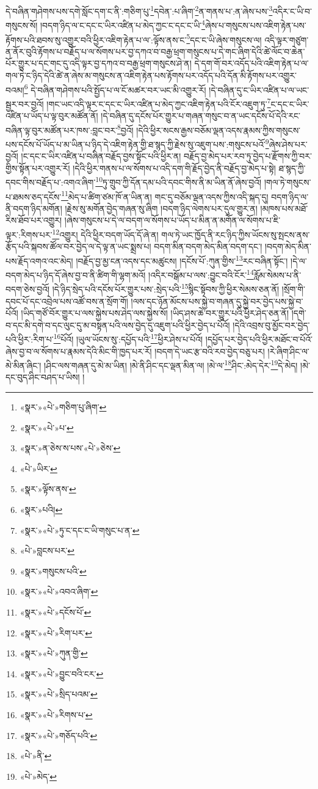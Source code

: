 དེ་བཞིན་གཤེགས་པས་དགེ་སློང་དག་ང་ནི་:གཅིག་པུ་\footnote{«སྣར་»«པེ་»གཅིག་པུ་ཞིག་}དབེན་:པ་ཞིག་\footnote{«སྣར་»«པེ་»པ་}ན་གནས་པ་:ན་ཞེས་པས་\footnote{«སྣར་»ན་ཅེས་ས་པས་«པེ་»ཅེས་}འདིར་ང་ཡི་བ་གསུངས་སོ། །བདག་ཉིད་ལ་ང་དང་ང་ཡིར་འཛིན་པ་མེད་ཀྱང་ང་དང་ང་ཡི་\footnote{«པེ་»ཡིར་}ཞེས་པ་གསུངས་པས་འཇིག་རྟེན་པས་རྟོགས་པའི་ཐབས་སུ་འགྱུར་བའི་ཕྱིར་འཇིག་རྟེན་པ་ལ་:ལྟོས་ནས་ང་\footnote{«སྣར་»ལྟོས་ནས་}དང་ང་ཡི་ཞེས་གསུངས་ལ། འདི་ལྟར་གཙུག་ན་ནོར་བུའི་རྟོགས་པ་བརྗོད་པ་ལ་སོགས་པར་བྱ་དཀའ་བ་བརྒྱ་ཕྲག་གསུངས་པ་དེ་གང་ཞིག་དེའི་ཚེ་ལོང་བ་ཆེན་པོར་གྱུར་པ་དང་གང་དུ་འདི་ལྟར་བྱ་དཀའ་བ་བརྒྱ་ཕྲག་གསུངས་ཤེ་ན། དེ་དག་གོ་བར་འདོད་པའི་འཇིག་རྟེན་པ་ལ་གལ་ཏེ་ང་ཉིད་དེའི་ཚེ་ན་ཞེས་མ་གསུངས་ན་འཇིག་རྟེན་པས་རྟོགས་པར་འདོད་པའི་དོན་མི་རྟོགས་པར་འགྱུར་བའམ།\footnote{«སྣར་»པའི།} དེ་བཞིན་གཤེགས་པའི་སྤྱོད་པ་ལ་ངོ་མཚར་བར་ཡང་མི་འགྱུར་རོ། །དེ་བཞིན་དུ་ང་ཡིར་འཛིན་པ་ལ་ཡང་སྦྱར་བར་བྱའོ། །གང་ཡང་འདི་ལྟར་ང་དང་ང་ཡིར་འཛིན་པ་མེད་ཀྱང་འཇིག་རྟེན་པའི་ངོར་འཇུག་ཏུ་\footnote{«སྣར་»«པེ་»ཏུ་ང་དང་ང་ཡི་གསུང་པ་ན་}ང་དང་ང་ཡིར་འཛིན་པ་ཡོད་པ་ལྟ་བུར་མཚོན་ནོ། །དེ་བཞིན་དུ་དངོས་པོར་གྱུར་པ་གཞན་གསུང་བ་ན་ཡང་དངོས་པོ་དེའི་རང་བཞིན་ལྟ་བུར་མཚོན་པར་ཁས་:བླང་བར་\footnote{«པེ་»བླངས་པར་}བྱའོ། །དེའི་ཕྱིར་སངས་རྒྱས་བཅོམ་ལྡན་འདས་རྣམས་ཀྱིས་གསུངས་པས་དངོས་པོ་ཡོད་པ་མ་ཡིན་པ་ཉིད་དེ་འཇིག་རྟེན་གྱི་ཐ་སྙད་ཀྱི་རྗེས་སུ་འཇུག་པས་:གསུངས་པའོ་\footnote{«སྣར་»གསུངས་པའི་}ཞེས་ཤེས་པར་བྱའོ། །ང་དང་ང་ཡིར་འཛིན་པ་བཞིན་བརྗོད་བྱས་སྟོང་པའི་ཕྱིར་ན། བརྗོད་བྱ་མེད་པར་རབ་ཏུ་བྱེད་པ་རྫོགས་ཀྱི་བར་གྱིས་སྟོན་པར་འགྱུར་རོ། །དེའི་ཕྱིར་གནས་པ་ལ་སོགས་པ་འདི་དག་གི་རྗོད་བྱེད་ནི་བརྗོད་བྱ་མེད་པ་སྟེ། ཐ་སྙད་ཀྱི་དབང་གིས་བརྗོད་པ་:འགའ་ཞིག་\footnote{«སྣར་»«པེ་»འབའ་ཞིག་}ཏུ་གྲུབ་ཀྱི་དོན་དམ་པའི་དབང་གིས་ནི་མ་ཡིན་ནོ་ཞེས་བྱའོ། །གལ་ཏེ་གསུངས་པ་ཐམས་ཅད་དངོས་\footnote{«སྣར་»«པེ་»དངོས་པོ་}མེད་པ་ཚིག་ཙམ་ཁོ་ན་ཡིན་ན། གང་དུ་བཅོམ་ལྡན་འདས་ཀྱིས་འདི་སྐད་དུ། བདག་ཉིད་ལ་ནི་བདག་ཉིད་མགོན། །རྗེས་སུ་མགོན་བྱེད་གཞན་སུ་ཞིག །བདག་ཉིད་ལེགས་པར་དུལ་གྱུར་ན། །མཁས་པས་མཐོ་རིས་ཐོབ་པར་འགྱུར། །ཞེས་གསུངས་པ་དེ་ལ་བདག་ལ་སོགས་པ་ཡོད་པ་མིན་ན་མགོན་ལ་སོགས་པ་ཇི་ལྟར་:རིགས་པར་\footnote{«སྣར་»«པེ་»རིག་པར་}འགྱུར། དེའི་ཕྱིར་བདག་ཡོད་དོ་ཞེ་ན། གལ་ཏེ་ཡང་ཁྱོད་ནི་རང་ཉིད་ཀྱིས་ཡོངས་སུ་སྤངས་ནས་རྩོད་པའི་སྐབས་ཚོལ་བར་བྱེད་ལ་དེ་ལྟ་ན་ཡང་སྨྲས་པ། བདག་མིན་བདག་མེད་མིན་བདག་དང་། །བདག་མེད་མིན་པས་རྗོད་འགའ་འང་མེད། །བརྗོད་བྱ་མྱ་ངན་འདས་དང་མཚུངས། །དངོས་པོ་:ཀུན་གྱིས་\footnote{«སྣར་»«པེ་»ཀུན་གྱི་}རང་བཞིན་སྟོང་། །དེ་ལ་བདག་མེད་པ་ཉིད་དོ་ཞེས་བྱ་བ་ནི་ཚིག་གི་ལྷག་མའོ། །འདིར་བསྒོམ་པ་ལས་:བྱུང་བའི་ངོར་\footnote{«སྣར་»«པེ་»བྱུང་བའི་ངར་}རློམ་སེམས་པ་ནི་བདག་ཅེས་བྱའོ། །དེ་ཉིད་སྲེད་པའི་དངོས་པོར་གྱུར་པས་:སྲེད་པའི་\footnote{«སྣར་»«པེ་»སྲིད་པའམ་}སྙིང་སྟོབས་ཀྱི་ཕྱིར་སེམས་ཅན་ནོ། །སྲོག་གི་དབང་པོ་དང་འབྲེལ་པས་འཚོ་བས་ན་སྲོག་གོ། །ལས་དང་ཉོན་མོངས་པས་སྐྱེ་བ་གཞན་དུ་སྐྱེ་བར་བྱེད་པས་སྐྱེ་བ་པོའོ། །ཡིད་གཙོ་བོར་གྱུར་པ་ལས་སྐྱེས་པས་ཤེད་ལས་སྐྱེས་སོ། །ཡིད་ཤས་ཆེ་བར་གྱུར་པའི་ཕྱིར་ཤེད་ཅན་ནོ། །དགེ་བ་དང་མི་དགེ་བ་དང་ལུང་དུ་མ་བསྟན་པའི་ལས་བྱེད་དུ་འཇུག་པའི་ཕྱིར་བྱེད་པ་པོའོ། །དེའི་འབྲས་བུ་མྱོང་བར་བྱེད་པའི་ཕྱིར་:རིག་པ་\footnote{«སྣར་»«པེ་»རིགས་པ་}པོའོ། །ཡུལ་ཡོངས་སུ་:དཔྱོད་པའི་\footnote{«སྣར་»«པེ་»གཅོད་པའི་}ཕྱིར་ཤེས་པ་པོའོ། །དཔྱོད་པར་བྱེད་པའི་ཕྱིར་མཐོང་བ་པོའོ་ཞེས་བྱ་བ་ལ་སོགས་པ་རྣམས་དེའི་མིང་གི་ཁྱད་པར་རོ། །བདག་དེ་ཡང་རྩ་བའི་རབ་བྱེད་བཅུ་པར། །རེ་ཞིག་ཤིང་ལ་མེ་མིན་ཞིང་། །ཤིང་ལས་གཞན་དུ་མེ་མ་ཡིན། །མེ་ནི་ཤིང་དང་ལྡན་མིན་ལ། །མེ་ལ་\footnote{«པེ་»ནི་}ཤིང་:མེད་དེར་\footnote{«པེ་»མེད་}དེ་མེད། །མེ་དང་བུད་ཤིང་བཤད་པ་ཡིས། །
